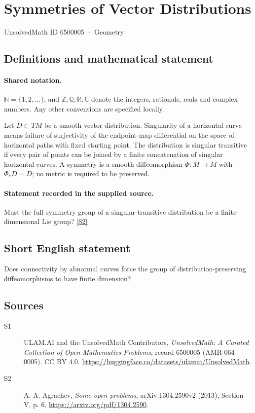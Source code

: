 \documentclass[11pt]{article}
\newcommand{\sref}[2]{\hyperlink{source:#1:#2}{[S#2]}}
\begin{document}
\setcounter{section}{6500004}
\section{Symmetries of Vector Distributions}\label{6500005}
{\small\sffamily UnsolvedMath ID 6500005 · Geometry}
\subsection{Definitions and mathematical statement}

\paragraph{Shared notation.}$\mathbb N=\{1,2,\ldots\}$, and $\mathbb Z,\mathbb Q,\mathbb R,\mathbb C$ denote the integers, rationals, reals and complex numbers. Any other conventions are specified locally.


Let $D\subset TM$ be a smooth vector distribution. Singularity of a horizontal curve means failure of surjectivity of the endpoint-map differential on the space of horizontal paths with fixed starting point. The distribution is singular transitive if every pair of points can be joined by a finite concatenation of singular horizontal curves. A symmetry is a smooth diffeomorphism $\Phi:M\to M$ with $\Phi_*D=D$; no metric is required to be preserved.
\paragraph{Statement recorded in the supplied source.}
Must the full symmetry group of a singular-transitive distribution be a finite-dimensional Lie group? \sref{6500005}{2}
\subsection{Short English statement}
Does connectivity by abnormal curves force the group of distribution-preserving diffeomorphisms to have finite dimension?
\subsection{Sources}
\begin{description}
\item[\hypertarget{source:6500005:1}{S1}] ULAM.AI and the UnsolvedMath Contributors, \emph{UnsolvedMath: A Curated Collection of Open Mathematics Problems}, record 6500005 (AMR-064-0005). CC BY 4.0. \url{https://huggingface.co/datasets/ulamai/UnsolvedMath}.
\item[\hypertarget{source:6500005:2}{S2}] A. A. Agrachev, \emph{Some open problems}, arXiv:1304.2590v2 (2013), Section V, p. 6. \url{https://arxiv.org/pdf/1304.2590}.
\end{description}
\label{end:6500005}
\end{document}

